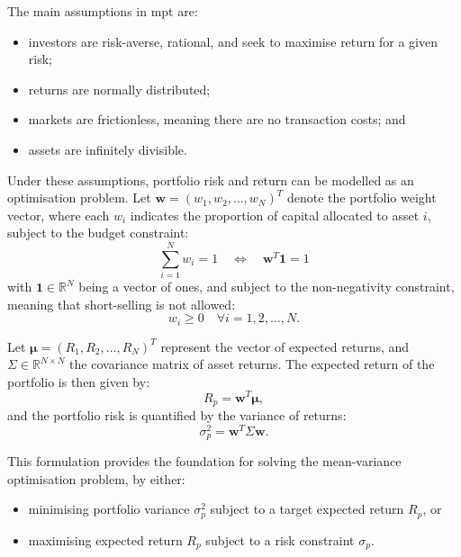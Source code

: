 The main assumptions in \acrshort{mpt} are:
\begin{itemize}
    \item investors are risk-averse, rational, and seek to maximise return for a given risk;
	\item returns are normally distributed;
	\item markets are frictionless, meaning there are no transaction costs; and
	\item assets are infinitely divisible.
\end{itemize}

Under these assumptions, portfolio risk and return can be modelled as an optimisation problem. Let $\mathbf{w} = \left(w_1, w_2, \dots, w_N\right)^T$ denote the portfolio weight vector, where each $w_i$ indicates the proportion of capital allocated to asset $i$, subject to the budget constraint:
\begin{equation}
    \sum_{i=1}^{N} w_i = 1 \quad \Leftrightarrow \quad \mathbf{w}^T \mathbf{1} = 1
\end{equation}
with $\mathbf{1} \in \mathbb{R}^N$ being a vector of ones, and subject to the non-negativity constraint, meaning that short-selling is not allowed:
\begin{equation}
    w_i \geq 0 \quad \forall i = 1, 2, \dots, N.
\end{equation}

Let $\bm{\mu} = \left(R_1, R_2, \dots, R_N\right)^T$ represent the vector of expected returns, and $\Sigma \in \mathbb{R}^{N \times N}$ the covariance matrix of asset returns. The expected return of the portfolio is then given by:
\begin{equation}
    R_p = \mathbf{w}^T \bm{\mu},
\end{equation}
and the portfolio risk is quantified by the variance of returns:
\begin{equation}
    \sigma_p^2 = \mathbf{w}^T \Sigma \mathbf{w}.
\end{equation}

This formulation provides the foundation for solving the mean-variance optimisation problem, by either:
\begin{itemize}
    \item minimising portfolio variance $\sigma_p^2$ subject to a target expected return $R_p$, or
    \item maximising expected return $R_p$ subject to a risk constraint $\sigma_p$.
\end{itemize}

